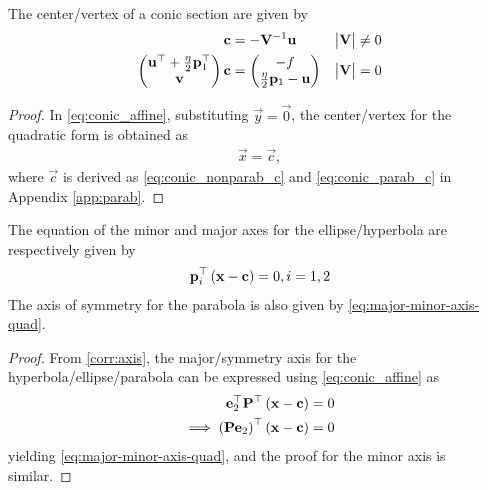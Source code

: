 
	\begin{corollary}
		The center/vertex of a conic section are given by
  \begin{align}
    \label{eq:conic_nonparab_c}
	    \mathbf{c} &= - \mathbf{V}^{-1}\mathbf{u}  & \begin{vmatrix}\mathbf{V}\end{vmatrix} \ne 0
    \\
	    \begin{pmatrix} \mathbf{u}^{\top}+\frac{\eta}{2}\mathbf{p}_1^{\top} \\ \mathbf{v}\end{pmatrix}\mathbf{c} &= \begin{pmatrix}-f \\ \frac{\eta}{2}\mathbf{p}_1-\mathbf{u}\end{pmatrix}  
& \begin{vmatrix}\mathbf{V}\end{vmatrix} = 0
    \label{eq:conic_parab_c}
    \end{align}	
	\end{corollary}
		\begin{proof}
			In 
			\eqref{eq:conic_affine}, substituting $\vec{y} = \vec{0}$, the center/vertex for the quadratic form is obtained as
    \begin{align}
	    \vec{x} = \vec{c}, 
    \end{align}
			where $\vec{c}$ is derived as 
    \eqref{eq:conic_nonparab_c}
    and 
    \eqref{eq:conic_parab_c}
in Appendix  \ref{app:parab}.
		\end{proof}

%
    \begin{corollary} The equation of the minor and major  axes for the ellipse/hyperbola are respectively given by 
  \begin{align}
\mathbf{p}_i^{\top}\left(\mathbf{x}-\mathbf{c}\right) = 0, i = 1,2
	  \label{eq:major-minor-axis-quad}
  \end{align}
  The axis of symmetry for the parabola is also given by 
	  \eqref{eq:major-minor-axis-quad}.
\end{corollary}
		\begin{proof}
From		\eqref{corr:axis}, the major/symmetry axis for the hyperbola/ellipse/parabola can be expressed using 
\eqref{eq:conic_affine} as
  \begin{align}
	  \mathbf{e}_2^{\top}
		  \mathbf{P}^{\top}\left(\mathbf{x}-\mathbf{c}\right) &= 0
		  \\
	  \implies 		  \left(\mathbf{P}\mathbf{e}_2\right)^{\top}\left(\mathbf{x}-\mathbf{c}\right) &= 0
  \end{align}
yielding	  \eqref{eq:major-minor-axis-quad}, and the proof for the minor axis is similar.
		\end{proof}

